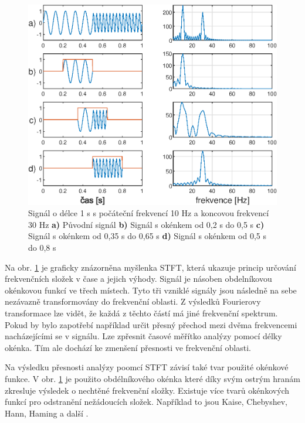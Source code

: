   \begin{figure}[H]
    \centering
    \includegraphics[width = 1\linewidth]{obrazky/STFT.eps}
    \caption{Signál o délce 1 s s počáteční frekvencí 10 Hz a koncovou frekvencí 30 Hz \textbf{a)} Původní signál \textbf{b)} Signál s okénkem od 0,2 s do 0,5 s \textbf{c)} Signál s okénkem od 0,35 s do 0,65 s \textbf{d)} Signál s okénkem od 0,5 s do 0,8 s \cite{fundamental_of_music_processing}}
    \label{fig:STFT}
  \end{figure}

  Na obr. \ref{fig:STFT} je graficky znázorněna myšlenka \acs{STFT}, která ukazuje princip určování frekvenčních složek v čase a jejich výhody. 
  Signál je násoben obdelníkovou okénkovou funkcí ve třech místech.
  Tyto tři vzniklé signály jsou následně na sebe nezávazně transformovány do frekvenční oblasti.
  Z výsledků Fourierovy transformace lze vidět, že každá z těchto částí má jiné frekvenční spektrum.
  Pokud by bylo zapotřebí například určit přesný přechod mezi dvěma frekvencemi nacházejícími se v signálu. Lze zpřesnit časové měřítko analýzy pomocí délky okénka.
  Tím ale dochází ke zmenšení přesnosti ve frekvenční oblasti.
  
  Na výsledku přesnosti analýzy poomcí \acs{STFT} závisí také tvar použité okénkové funkce.
  V obr. \ref{fig:STFT} je použito obdélníkového okénka které díky svým ostrým hranám zkresluje výsledek o nechtěné frekvenční složky.
  Existuje více tvarů okénkových funkcí pro odstranění nežádoucích složek.
  Například to jsou Kaise, Chebyshev, Hann, Haming a další \cite{Time-frequency_distributions}.
  
